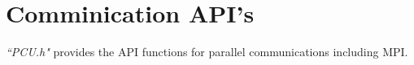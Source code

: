 \section{Comminication API's}

\emph{``PCU.h"} provides the API functions for parallel communications including MPI. 

